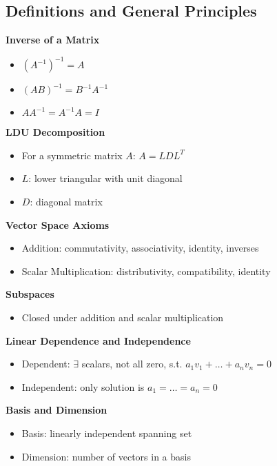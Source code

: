\documentclass[8pt, a4paper, landscape]{extarticle}
\begin{document}
\begin{multicols*}{4}

  \section*{Definitions and General Principles}

  \textbf{Inverse of a Matrix}
  \begin{itemize}
    \item $(A^{-1})^{-1} = A$
    \item $(AB)^{-1} = B^{-1}A^{-1}$
    \item $AA^{-1} = A^{-1}A = I$
  \end{itemize}

  \textbf{LDU Decomposition}
  \begin{itemize}
    \item For a symmetric matrix $A$: $A = LDL^T$
    \item $L$: lower triangular with unit diagonal
    \item $D$: diagonal matrix
  \end{itemize}

  \textbf{Vector Space Axioms}
  \begin{itemize}
    \item Addition: commutativity, associativity, identity, inverses
    \item Scalar Multiplication: distributivity, compatibility, identity
  \end{itemize}

  \textbf{Subspaces}
  \begin{itemize}
    \item Closed under addition and scalar multiplication
  \end{itemize}

  \textbf{Linear Dependence and Independence}
  \begin{itemize}
    \item Dependent: $\exists$ scalars, not all zero, s.t. $a_1v_1 + \ldots + a_nv_n = 0$
    \item Independent: only solution is $a_1 = \ldots = a_n = 0$
  \end{itemize}

  \textbf{Basis and Dimension}
  \begin{itemize}
    \item Basis: linearly independent spanning set
    \item Dimension: number of vectors in a basis
  \end{itemize}


\end{multicols*}
\end{document}
